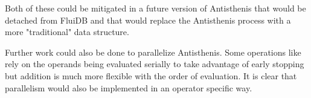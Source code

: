 Both of these could be mitigated in a future version of Antisthenis
that would be detached from FluiDB and that would replace the
Antisthenis process with a more "traditional" data structure.

Further work could also be done to parallelize Antisthenis. Some
operations like  rely on the operands being evaluated
serially to take advantage of early stopping but addition is much more
flexible with the order of evaluation. It is clear that parallelism
would also be implemented in an operator specific way.

